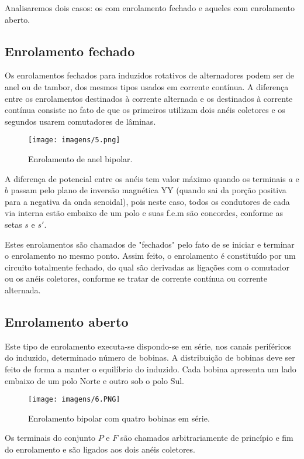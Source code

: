Analisaremos dois casos: os com enrolamento fechado e aqueles com enrolamento aberto.

\subsection{Enrolamento fechado}

Os enrolamentos fechados para induzidos rotativos de alternadores podem ser de anel ou de tambor, dos mesmos tipos usados em corrente contínua. A diferença entre os enrolamentos destinados à corrente alternada e os destinados à corrente contínua consiste no fato de que os primeiros utilizam dois anéis coletores e os segundos usarem comutadores de lâminas.

\begin{figure}[ht!]
\center 
\texttt{[image: imagens/5.png]}
\caption{Enrolamento de anel bipolar.}
\end{figure}

A diferença de potencial entre os anéis tem valor máximo quando os terminais $a$ e $b$ passam pelo plano de inversão magnética YY (quando sai da porção positiva para a negativa da onda senoidal), pois neste caso, todos os condutores de cada via interna estão embaixo de um polo e suas f.e.m são concordes, conforme as setas $s$ e $s'$.

Estes enrolamentos são chamados de "fechados" pelo fato de se iniciar e terminar o enrolamento no mesmo ponto. Assim feito, o enrolamento é constituído por um circuito totalmente fechado, do qual são derivadas as ligações com o comutador ou os anéis coletores, conforme se tratar de corrente contínua ou corrente alternada.

\subsection{Enrolamento aberto}

Este tipo de enrolamento executa-se dispondo-se em série, nos canais periféricos do induzido, determinado número de bobinas. A distribuição de bobinas deve ser feito de forma a manter o equilíbrio do induzido. Cada bobina apresenta um lado embaixo de um polo Norte e outro sob o polo Sul.

\begin{figure}[ht!]
\center 
\texttt{[image: imagens/6.PNG]}
\caption{Enrolamento bipolar com quatro bobinas em série.}
\end{figure}

Os terminais do conjunto $P$ e $F$ são chamados arbitrariamente de princípio e fim do enrolamento e são ligados aos dois anéis coletores.

